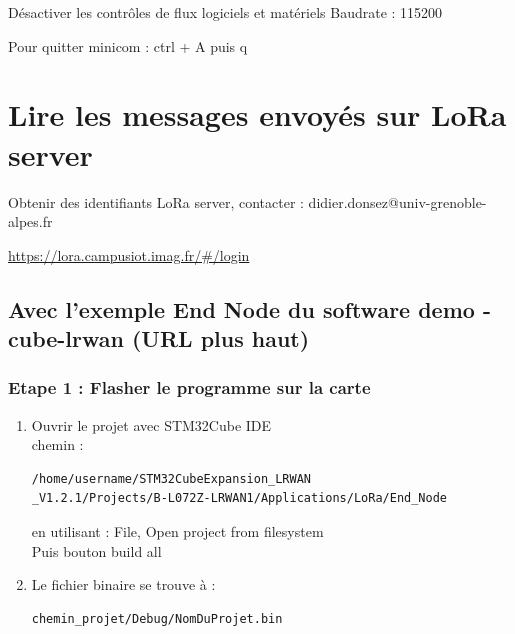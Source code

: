 \documentclass{article}
\begin{document}
\begin{itemize}
\begin{enumerate}
Désactiver les contrôles de flux logiciels et matériels
Baudrate : 115200


Pour quitter minicom : ctrl + A puis q

\end{enumerate}




\section{Lire les messages envoyés sur LoRa server}

Obtenir des identifiants LoRa server, contacter : didier.donsez@univ-grenoble-alpes.fr

\url{https://lora.campusiot.imag.fr/#/login}

\subsection{Avec l'exemple End Node  du software demo -cube-lrwan (URL plus haut)}

\subsubsection{Etape 1 : Flasher le programme sur la carte}

\begin{enumerate}
    


\item Ouvrir le projet avec STM32Cube IDE \\ chemin :
\begin{verbatim}
/home/username/STM32CubeExpansion_LRWAN
_V1.2.1/Projects/B-L072Z-LRWAN1/Applications/LoRa/End_Node
\end{verbatim}

en utilisant : File, Open project from filesystem \\
Puis bouton build all \\
\item


Le fichier binaire se trouve à :

\begin{verbatim}
chemin_projet/Debug/NomDuProjet.bin
\end{verbatim}

\end{enumerate}
\end{itemize}
\end{document}
